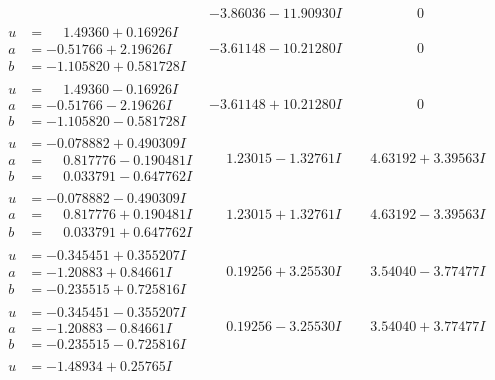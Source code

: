 \documentclass[1p]{elsarticle_modified}
\theoremstyle{definition}
\begin{document}
$$\begin{array}{c|c|c}
 & -3.86036 - 11.90930 I & \phantom{-0.000000 } 0 \\ \hline\begin{aligned}
u &= \phantom{-}1.49360 + 0.16926 I \\
a &= -0.51766 + 2.19626 I \\
b &= -1.105820 + 0.581728 I\end{aligned}
 & -3.61148 - 10.21280 I & \phantom{-0.000000 } 0 \\ \hline\begin{aligned}
u &= \phantom{-}1.49360 - 0.16926 I \\
a &= -0.51766 - 2.19626 I \\
b &= -1.105820 - 0.581728 I\end{aligned}
 & -3.61148 + 10.21280 I & \phantom{-0.000000 } 0 \\ \hline\begin{aligned}
u &= -0.078882 + 0.490309 I \\
a &= \phantom{-}0.817776 - 0.190481 I \\
b &= \phantom{-}0.033791 - 0.647762 I\end{aligned}
 & \phantom{-}1.23015 - 1.32761 I & \phantom{-}4.63192 + 3.39563 I \\ \hline\begin{aligned}
u &= -0.078882 - 0.490309 I \\
a &= \phantom{-}0.817776 + 0.190481 I \\
b &= \phantom{-}0.033791 + 0.647762 I\end{aligned}
 & \phantom{-}1.23015 + 1.32761 I & \phantom{-}4.63192 - 3.39563 I \\ \hline\begin{aligned}
u &= -0.345451 + 0.355207 I \\
a &= -1.20883 + 0.84661 I \\
b &= -0.235515 + 0.725816 I\end{aligned}
 & \phantom{-}0.19256 + 3.25530 I & \phantom{-}3.54040 - 3.77477 I \\ \hline\begin{aligned}
u &= -0.345451 - 0.355207 I \\
a &= -1.20883 - 0.84661 I \\
b &= -0.235515 - 0.725816 I\end{aligned}
 & \phantom{-}0.19256 - 3.25530 I & \phantom{-}3.54040 + 3.77477 I \\ \hline\begin{aligned}
u &= -1.48934 + 0.25765 I \\

\end{aligned}
\end{array}$$
\end{document}
